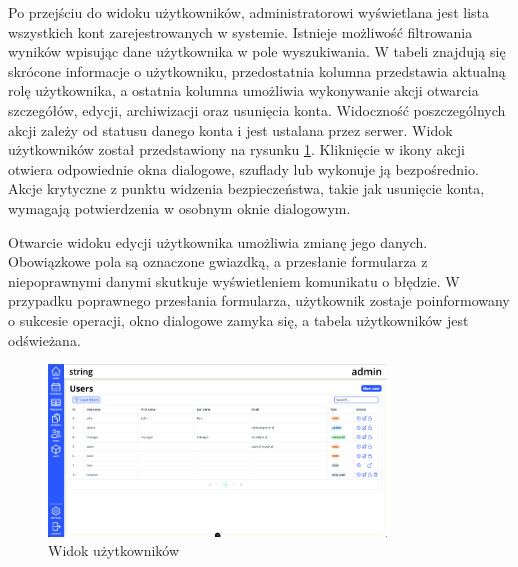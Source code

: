 Po przejściu do widoku użytkowników, administratorowi wyświetlana jest lista wszystkich kont zarejestrowanych w systemie. Istnieje możliwość filtrowania wyników wpisując dane użytkownika w pole wyszukiwania. W tabeli znajdują się skrócone informacje o użytkowniku, przedostatnia kolumna przedstawia aktualną rolę użytkownika, a ostatnia kolumna umożliwia wykonywanie akcji otwarcia szczegółów, edycji, archiwizacji oraz usunięcia konta. Widoczność poszczególnych akcji zależy od statusu danego konta i jest ustalana przez serwer. Widok użytkowników został przedstawiony na rysunku \ref{fig:usersView}. Kliknięcie w ikony akcji otwiera odpowiednie okna dialogowe, szuflady lub wykonuje ją bezpośrednio. Akcje krytyczne z punktu widzenia bezpieczeństwa, takie jak usunięcie konta, wymagają potwierdzenia w osobnym oknie dialogowym.

Otwarcie widoku edycji użytkownika umożliwia zmianę jego danych. Obowiązkowe pola są oznaczone gwiazdką, a przesłanie formularza z niepoprawnymi danymi skutkuje wyświetleniem komunikatu o błędzie. W przypadku poprawnego przesłania formularza, użytkownik zostaje poinformowany o sukcesie operacji, okno dialogowe zamyka się, a tabela użytkowników jest odświeżana.

\begin{figure}[H]
    \centering
    \includegraphics[width=0.8\textwidth, frame]{graf/front/users.png}
    \caption{Widok użytkowników}
    \label{fig:usersView}
\end{figure}

